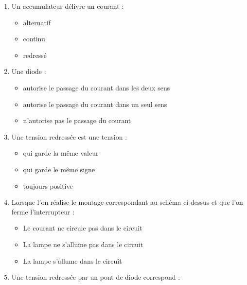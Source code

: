 \documentclass[11pt,a4paper]{article}
\begin{document}
\begin{enumerate}
\item Un accumulateur délivre un courant :
\begin{itemize}[label=$\square$]
\item alternatif
\item continu
\item redressé
\end{itemize}

\item Une diode :
\begin{itemize}[label=$\square$]
\item autorise le passage du courant dans les deux sens
\item autorise le passage du courant dans un seul sens
\item n'autorise pas le passage du courant
\end{itemize}

\item Une tension redressée est une tension :
\begin{itemize}[label=$\square$]
\item qui garde la même valeur
\item qui garde le même signe
\item toujours positive
\end{itemize}

\item Lorsque l'on réalise le montage correspondant au schéma ci-dessus et que l'on ferme l'interrupteur :
\begin{itemize}[label=$\square$]
\item Le courant ne circule pas dans le circuit
\item La lampe ne s'allume pas dans le circuit
\item La lampe s'allume dans le circuit
\end{itemize}

\item Une tension redressée par un pont de diode correspond :


\end{enumerate}
\end{document}

